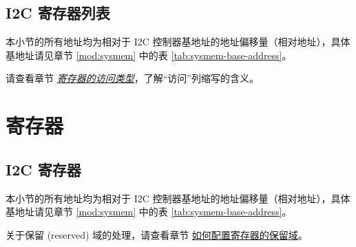\documentclass[main\_\_CN.tex]{subfiles}
\begin{document}
\subsection{I2C 寄存器列表}
\label{sec:i2c-reg-summ}
\hypertarget{i2c-reg-summ}{}

本小节的所有地址均为相对于 I2C 控制器基地址的地址偏移量（相对地址），具体基地址请见章节 \ref{mod:sysmem} \textit{} 中的表 \ref{tab:sysmem-base-address}。

请查看章节 \hyperref[glossary-access-types]{\textit{寄存器的访问类型}}，了解“访问”列缩写的含义。





\newpage
\section{寄存器}

\subsection{I2C 寄存器}

本小节的所有地址均为相对于 I2C 控制器基地址的地址偏移量（相对地址），具体基地址请见章节 \ref{mod:sysmem} \textit{} 中的表 \ref{tab:sysmem-base-address}。

关于保留 (reserved) 域的处理，请查看章节 \hyperref[programming-reserved-field]{如何配置寄存器的保留域}。


\end{document}
